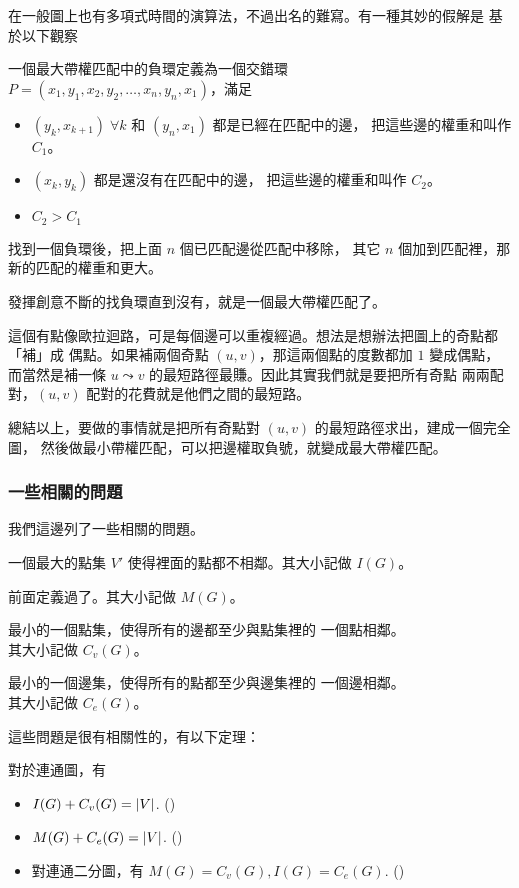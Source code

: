 \documentclass[a4paper,12pt]{book}
\begin{document}
在一般圖上也有多項式時間的演算法，不過出名的難寫。有一種其妙的假解是
基於以下觀察
\begin{theorem}[定義]
  一個最大帶權匹配中的負環定義為一個交錯環\\
  $P = (x_1, y_1, x_2, y_2, \dots, x_n, y_n, x_1)$，滿足
  \begin{itemize}
    \item $(y_k, x_{k+1}) \; \forall k$ 和 $(y_n, x_1)$ 都是已經在匹配中的邊，
      把這些邊的權重和叫作 $C_1$。
    \item $(x_k, y_{k})$ 都是還沒有在匹配中的邊，
      把這些邊的權重和叫作 $C_2$。
    \item $C_2 > C_1$
  \end{itemize}
  找到一個負環後，把上面 $n$ 個已匹配邊從匹配中移除，
  其它 $n$ 個加到匹配裡，那新的匹配的權重和更大。
\end{theorem}
發揮創意不斷的找負環直到沒有，就是一個最大帶權匹配了。

這個有點像歐拉迴路，可是每個邊可以重複經過。想法是想辦法把圖上的奇點都「補」成
偶點。如果補兩個奇點 $(u, v)$，那這兩個點的度數都加 $1$ 變成偶點，
而當然是補一條 $u \leadsto v$ 的最短路徑最賺。因此其實我們就是要把所有奇點
兩兩配對，$(u, v)$ 配對的花費就是他們之間的最短路。 

總結以上，要做的事情就是把所有奇點對 $(u, v)$ 的最短路徑求出，建成一個完全圖，
然後做最小帶權匹配，可以把邊權取負號，就變成最大帶權匹配。

\subsubsection{一些相關的問題}
我們這邊列了一些相關的問題。
\begin{description}[leftmargin=*]
  \item[最大獨立點集] 一個最大的點集 $V'$ 使得裡面的點都不相鄰。其大小記做 $I(G)$。
  \item[最大匹配數] 前面定義過了。其大小記做 $M(G)$。
  \item[最小點覆蓋] 最小的一個點集，使得所有的邊都至少與點集裡的
    一個點相鄰。\\其大小記做 $C_v(G)$。
  \item[最小邊覆蓋] 最小的一個邊集，使得所有的點都至少與邊集裡的
    一個邊相鄰。\\其大小記做 $C_e(G)$。
\end{description}
這些問題是很有相關性的，有以下定理：
\begin{theorem}
  對於連通圖，有
  \begin{itemize}
      \item $I(G) + C_v(G) = \lvert V \rvert$. 
         \hfill{}(\theequation)\label{eq:m1}
      \item $M(G) + C_e(G) = \lvert V \rvert$.
         \hfill{}(\theequation)\label{eq:m2}
      \item 對連通二分圖，有 $M(G) = C_v(G), I(G) = C_e(G)$.
         \hfill{}(\theequation)\label{eq:m3}
  \end{itemize}
\end{theorem}
\end{document}
